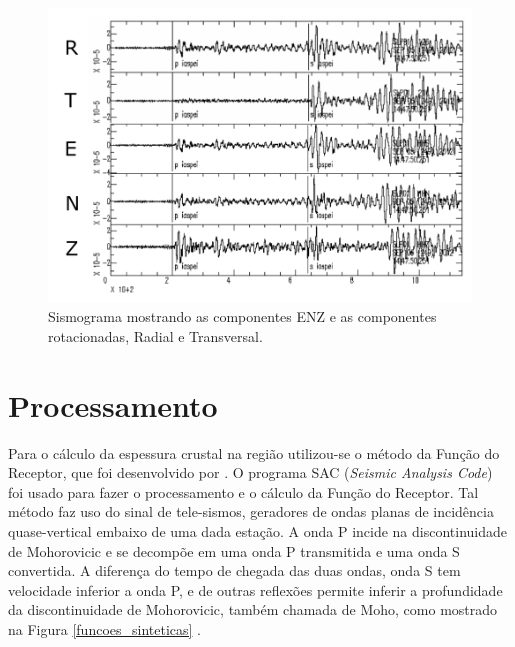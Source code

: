 \begin{figure}[!ht]
\centering
\includegraphics[scale=0.6]{Figs/Componente_Radial_Transversal.png}
\caption{Sismograma mostrando as componentes ENZ e as componentes rotacionadas, Radial e Transversal.}
\label{sismo_radial}
\end{figure}

\section{Processamento}

Para o cálculo da espessura crustal na região utilizou-se o método da Função do Receptor, que foi desenvolvido por \cite{Langston_1977}. O programa SAC (\textit{Seismic Analysis Code}) foi usado para fazer o processamento e o cálculo da Função do Receptor. Tal método faz uso do sinal de tele-sismos, geradores de ondas planas de incidência quase-vertical embaixo de uma dada estação. A onda P incide na discontinuidade de Mohorovicic e se decompõe em uma onda P transmitida e uma onda S convertida. A diferença do tempo de chegada das duas ondas, onda S tem velocidade inferior a onda P, e de outras reflexões permite inferir a profundidade da discontinuidade de Mohorovicic, também chamada de Moho, como mostrado na Figura \ref{funcoes_sinteticas} .

